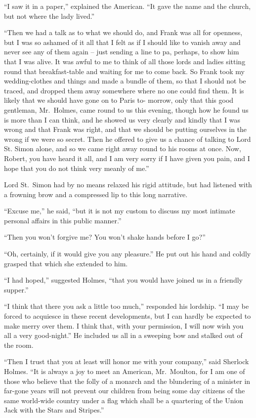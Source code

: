 “I saw it in a paper,” explained the American. “It gave
the name and the church, but not where the lady lived.”

“Then we had a talk as to what we should do, and Frank
was all for openness, but I was so ashamed of it all that I felt
as if I should like to vanish away and never see any of them
again -- just sending a line to pa, perhaps, to show him that I
was alive. It was awful to me to think of all those lords and
ladies sitting round that breakfast-table and waiting for me to
come back. So Frank took my wedding-clothes and things
and made a bundle of them, so that I should not be traced,
and dropped them away somewhere where no one could find
them. It is likely that we should have gone on to Paris to-%
morrow, only that this good gentleman, Mr.~Holmes, came
round to us this evening, though how he found us is more
than I can think, and he showed us very clearly and kindly
that I was wrong and that Frank was right, and that we
should be putting ourselves in the wrong if we were so secret.
Then he offered to give us a chance of talking to Lord St.
Simon alone, and so we came right away round to his rooms
at once. Now, Robert, you have heard it all, and I am very
sorry if I have given you pain, and I hope that you do not
think very meanly of me.”

Lord St.~Simon had by no means relaxed his rigid attitude,
but had listened with a frowning brow and a compressed lip
to this long narrative.

“Excuse me,” he said, “but it is not my custom to discuss
my most intimate personal affairs in this public manner.”

“Then you won’t forgive me? You won’t shake hands before
I go?”

“Oh, certainly, if it would give you any pleasure.” He put
out his hand and coldly grasped that which she extended to
him.

“I had hoped,” suggested Holmes, “that you would have
joined us in a friendly supper.”

“I think that there you ask a little too much,” responded
his lordship. “I may be forced to acquiesce in these recent
developments, but I can hardly be expected to make merry
over them. I think that, with your permission, I will now wish
you all a very good-night.” He included us all in a sweeping
bow and stalked out of the room.

“Then I trust that you at least will honor me with your
company,” said Sherlock Holmes. “It is always a joy to
meet an American, Mr.~Moulton, for I am one of those who
believe that the folly of a monarch and the blundering of a
minister in far-gone years will not prevent our children from
being some day citizens of the same world-wide country under
a flag which shall be a quartering of the Union Jack with the
Stars and Stripes.”

